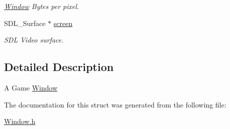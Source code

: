 \begin{DoxyCompactItemize}
\begin{DoxyCompactList}\small\item\em \hyperlink{structWindow}{Window} Bytes per pixel. \item\end{DoxyCompactList}\item 
\hypertarget{structWindow_a8aaaa21a533f83562f76535976c709c3}{
SDL\_\-Surface $\ast$ \hyperlink{structWindow_a8aaaa21a533f83562f76535976c709c3}{screen}}
\label{structWindow_a8aaaa21a533f83562f76535976c709c3}

\begin{DoxyCompactList}\small\item\em SDL Video surface. \item\end{DoxyCompactList}\end{DoxyCompactItemize}


\subsection{Detailed Description}
A Game \hyperlink{structWindow}{Window} 

The documentation for this struct was generated from the following file:\begin{DoxyCompactItemize}
\item 
\hyperlink{Window_8h}{Window.h}\end{DoxyCompactItemize}
